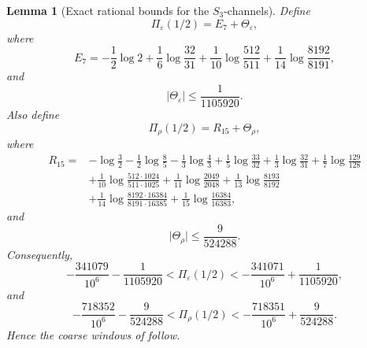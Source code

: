 \documentclass[11pt,a4paper]{amsart}
\theoremstyle{plain}
\newtheorem{lemma}[theorem]{Lemma}
\theoremstyle{definition}
\theoremstyle{remark}
\newcommand{\abs}[1]{\lvert #1 \rvert}
\begin{document}
\begin{lemma}[Exact rational bounds for the \(S_3\)-channels]
  \label{lem:appendix-s3-sharp-certificates}
  Define
  \begin{equation}\label{eq:s3-example-epsilon-certificate-sum}
    \Pi_\varepsilon(1/2)=E_7+\Theta_\varepsilon,
  \end{equation}
  where
  \[
    E_7
    =
    -\frac12\log 2
    +\frac16\log\frac{32}{31}
    +\frac1{10}\log\frac{512}{511}
    +\frac1{14}\log\frac{8192}{8191},
  \]
  and
  \begin{equation}\label{eq:s3-example-epsilon-tail-certificate}
    \abs{\Theta_\varepsilon}\le \frac{1}{1105920}.
  \end{equation}
  Also define
  \begin{equation}\label{eq:s3-example-rho-certificate-sum}
    \Pi_\rho(1/2)=R_{15}+\Theta_\rho,
  \end{equation}
  where
  \[
  \begin{aligned}
    R_{15}
    ={}&
    -\log\frac32
    -\frac12\log\frac85
    -\frac13\log\frac43
    +\frac15\log\frac{33}{32}
    +\frac13\log\frac{32}{31}
    +\frac17\log\frac{129}{128} \\
    &+\frac1{10}\log\frac{512\cdot 1024}{511\cdot 1025}
    +\frac1{11}\log\frac{2049}{2048}
    +\frac1{13}\log\frac{8193}{8192} \\
    &+\frac1{14}\log\frac{8192\cdot 16384}{8191\cdot 16385}
    +\frac1{15}\log\frac{16384}{16383},
  \end{aligned}
  \]
  and
  \begin{equation}\label{eq:s3-example-rho-tail-certificate}
    \abs{\Theta_\rho}\le \frac{9}{524288}.
  \end{equation}
  Consequently,
  \begin{equation}\label{eq:s3-example-certified-intervals-sharp}
    -\frac{341079}{10^6}-\frac{1}{1105920}
    <\Pi_\varepsilon(1/2)<
    -\frac{341071}{10^6}+\frac{1}{1105920},
  \end{equation}
  and
  \begin{equation}\label{eq:s3-example-certified-intervals-sharp-rho}
    -\frac{718352}{10^6}-\frac{9}{524288}
    <\Pi_\rho(1/2)<
    -\frac{718351}{10^6}+\frac{9}{524288}.
  \end{equation}
  Hence the coarse windows of
   follow.
\end{lemma}
\end{document}
